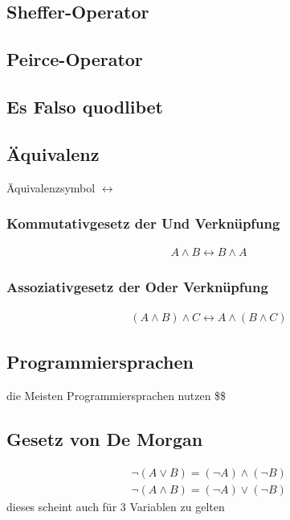 \documentclass[a4paper]{scrartcl}
\begin{document}
\subsection{Sheffer-Operator}

\subsection{Peirce-Operator}

\subsection{Es Falso quodlibet}

\subsection{Äquivalenz}
Äquivalenzsymbol $\leftrightarrow$

\subsubsection{Kommutativgesetz der Und Verknüpfung}
\begin{align}
A \wedge B \leftrightarrow B \wedge A
\end{align}

\subsubsection{Assoziativgesetz der Oder Verknüpfung}
\begin{align}
(A \wedge B) \wedge C \leftrightarrow A \wedge (B \wedge C)
\end{align}

\subsection{Programmiersprachen}
die Meisten Programmiersprachen nutzen \$\$ \\

\subsection{Gesetz von De Morgan}
\begin{align}
\boxed {
\neg (A \vee B) = (\neg A) \wedge (\neg B) } \\
\boxed {
\neg (A \wedge B) = (\neg A) \vee (\neg B) }
\end{align}
dieses scheint auch für 3 Variablen zu gelten
\end{document}
